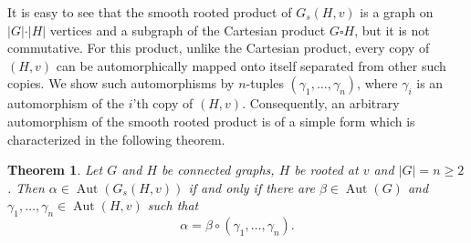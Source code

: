 \documentclass[12pt,a4paper, longbibliography]{article}
\newcommand{\Aut}{\ensuremath{\operatorname{Aut}}}
\newtheorem{theorem}{{\color{THM} Theorem}}[section]
\theoremstyle{definition}
\numberwithin{equation}{section}
\begin{document}
	
	
	It is easy to see that the smooth rooted product of $G_s(H,v)$ is a graph on $\vert G\vert \cdot \vert H \vert $ vertices and a subgraph of the Cartesian product $G\square H$, but it is not commutative. For this product, unlike the Cartesian product, every copy of $(H,v)$ can be automorphically mapped  onto itself separated from other such copies. We show such automorphisms by $n$-tuples $\left( \gamma_1,\ldots,\gamma_n\right)$, where $\gamma_i$ is an automorphism of the $i$'th copy of $(H,v)$. Consequently,  an arbitrary automorphism of  the smooth rooted product is of a simple form which is characterized  in the following theorem.
	
	\begin{theorem}\label{aut-rooted}
		Let $G$ and $H$ be connected graphs, $H$ be rooted at $v$ and $\vert G \vert =n\geq 2$. Then $\alpha\in \Aut(G_s(H,v))$ if and only if there are   $\beta\in\Aut(G)$ and $\gamma_1,\ldots , \gamma_n \in \Aut(H,v)$ such that 
		\[
		\alpha=\beta \circ \left( \gamma_1,\ldots,\gamma_n\right).
		\]
	\end{theorem}
\end{document}
